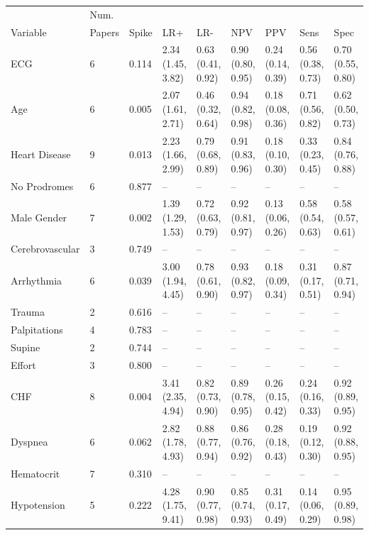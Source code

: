 \documentclass[AMA,STIX1COL]{WileyNJD-v2}
\begin{document}
\clearpage

\begin{table}
\centering
\begin{tabular}{lllllllll}
  \hline
             &   Num.      &	&	   &	     &		&	    &		& \\
Variable & Papers & Spike & LR+ & LR- & NPV & PPV & Sens & Spec \\ 
  \hline
ECG & 6 & 0.114 & 2.34 (1.45, 3.82) & 0.63 (0.41, 0.92) & 0.90 (0.80, 0.95) & 0.24 (0.14, 0.39) & 0.56 (0.38, 0.73) & 0.70 (0.55, 0.80) \\ 
  Age & 6 & 0.005 & 2.07 (1.61, 2.71) & 0.46 (0.32, 0.64) & 0.94 (0.82, 0.98) & 0.18 (0.08, 0.36) & 0.71 (0.56, 0.82) & 0.62 (0.50, 0.73) \\ 
  Heart Disease & 9 & 0.013 & 2.23 (1.66, 2.99) & 0.79 (0.68, 0.89) & 0.91 (0.83, 0.96) & 0.18 (0.10, 0.30) & 0.33 (0.23, 0.45) & 0.84 (0.76, 0.88) \\ 
  No Prodromes & 6 & 0.877 & -- & -- & -- & -- & -- & -- \\ 
  Male Gender & 7 & 0.002 & 1.39 (1.29, 1.53) & 0.72 (0.63, 0.79) & 0.92 (0.81, 0.97) & 0.13 (0.06, 0.26) & 0.58 (0.54, 0.63) & 0.58 (0.57, 0.61) \\ 
  Cerebrovascular & 3 & 0.749 & -- & -- & -- & -- & -- & -- \\ 
  Arrhythmia & 6 & 0.039 & 3.00 (1.94, 4.45) & 0.78 (0.61, 0.90) & 0.93 (0.82, 0.97) & 0.18 (0.09, 0.34) & 0.31 (0.17, 0.51) & 0.87 (0.71, 0.94) \\ 
  Trauma & 2 & 0.616 & -- & -- & -- & -- & -- & -- \\ 
  Palpitations & 4 & 0.783 & -- & -- & -- & -- & -- & -- \\ 
  Supine & 2 & 0.744 & -- & -- & -- & -- & -- & -- \\ 
  Effort & 3 & 0.800 & -- & -- & -- & -- & -- & -- \\ 
  CHF & 8 & 0.004 & 3.41 (2.35, 4.94) & 0.82 (0.73, 0.90) & 0.89 (0.78, 0.95) & 0.26 (0.15, 0.42) & 0.24 (0.16, 0.33) & 0.92 (0.89, 0.95) \\ 
  Dyspnea & 6 & 0.062 & 2.82 (1.78, 4.93) & 0.88 (0.77, 0.94) & 0.86 (0.76, 0.92) & 0.28 (0.18, 0.43) & 0.19 (0.12, 0.30) & 0.92 (0.88, 0.95) \\ 
  Hematocrit & 7 & 0.310 & -- & -- & -- & -- & -- & -- \\ 
  Hypotension & 5 & 0.222 & 4.28 (1.75, 9.41) & 0.90 (0.77, 0.98) & 0.85 (0.74, 0.93) & 0.31 (0.17, 0.49) & 0.14 (0.06, 0.29) & 0.95 (0.89, 0.98) \\ 

\end{tabular}
\end{table}
\end{document}
